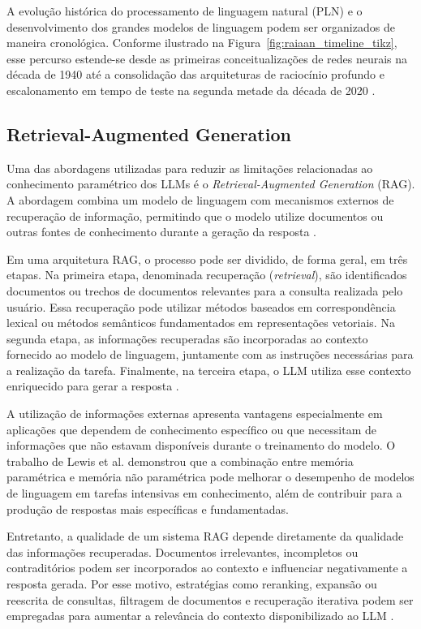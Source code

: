 A evolução histórica do processamento de linguagem natural (PLN) e o desenvolvimento dos grandes modelos de linguagem podem ser organizados de maneira cronológica. Conforme ilustrado na Figura~\ref{fig:raiaan_timeline_tikz}, esse percurso estende-se desde as primeiras conceitualizações de redes neurais na década de 1940 até a consolidação das arquiteturas de raciocínio profundo e escalonamento em tempo de teste na segunda metade da década de
2020 \cite{raiaan2024, zhao2026survey}.



\subsection{Retrieval-Augmented Generation}
\label{subsec:rag}

Uma das abordagens utilizadas para reduzir as limitações relacionadas ao conhecimento paramétrico dos LLMs é o \textit{Retrieval-Augmented Generation} (RAG). A abordagem combina um modelo de linguagem com mecanismos externos de recuperação de informação, permitindo que o modelo utilize documentos ou outras fontes de conhecimento durante a geração da resposta \cite{lewis2020rag}.

Em uma arquitetura RAG, o processo pode ser dividido, de forma geral, em três etapas. Na primeira etapa, denominada recuperação (\textit{retrieval}), são identificados documentos ou trechos de documentos relevantes para a consulta realizada pelo usuário. Essa recuperação pode utilizar métodos baseados em correspondência lexical ou métodos semânticos fundamentados em representações vetoriais. Na segunda etapa, as informações recuperadas são incorporadas ao contexto fornecido ao modelo de linguagem, juntamente com as instruções necessárias para a realização da tarefa. Finalmente, na terceira etapa, o LLM utiliza esse contexto enriquecido para gerar a resposta \cite{zhao2026survey}.

A utilização de informações externas apresenta vantagens especialmente em aplicações que dependem de conhecimento específico ou que necessitam de informações que não estavam disponíveis durante o treinamento do modelo. O trabalho de Lewis et al. \cite{lewis2020rag} demonstrou que a combinação entre memória paramétrica e memória não paramétrica pode melhorar o desempenho de modelos de linguagem em tarefas intensivas em conhecimento, além de contribuir para a produção de respostas mais específicas e fundamentadas.

Entretanto, a qualidade de um sistema RAG depende diretamente da qualidade das informações recuperadas. Documentos irrelevantes, incompletos ou contraditórios podem ser incorporados ao contexto e influenciar negativamente a resposta gerada. Por esse motivo, estratégias como reranking, expansão ou reescrita de consultas, filtragem de documentos e recuperação iterativa podem ser empregadas para aumentar a relevância do contexto disponibilizado ao LLM \cite{zhao2026survey}.

